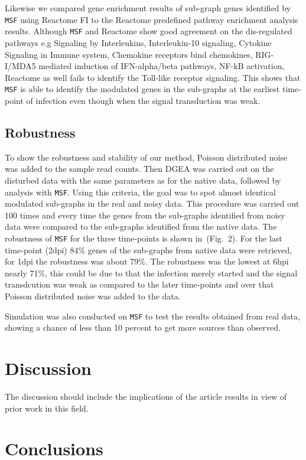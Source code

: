 \documentclass[twocolumn]{article}
\begin{document}
Likewise we compared gene enrichment results of sub-graph genes identified by \texttt{MSF} using Reactome FI to the Reactome predefined pathway enrichment analysis results. Although \texttt{MSF} and Reactome show good agreement on the dis-regulated pathways e.g Signaling by Interleukins, Interleukin-10 signaling, Cytokine Signaling in Immune system, Chemokine receptors bind chemokines, RIG-I/MDA5 mediated induction of IFN-alpha/beta pathways, NF-kB activation, Reactome as well fails to identify the Toll-like receptor signaling. This shows that \texttt{MSF} is able to identify the modulated genes in the sub-graphs at the earliest time-point of infection even though when the signal transduction was weak.

\subsection*{Robustness}

To show the robustness and stability of our method, Poisson
distributed noise was added to the sample read counts. 
Then DGEA was carried out on the disturbed data with the
same parameters as for the native data, followed by analysis with
\texttt{MSF}. Using this criteria, the goal was to spot almost
identical modulated sub-graphs in the real and noisy data. This procedure was carried out 100 times and every time the genes from the sub-graphs identified from noisy data were compared to the sub-graphs identified from the native data. The robustness of \texttt{MSF} for the three time-points is shown in~(Fig.~2). For the last time-point (2dpi) 84\% genes of the sub-graphs from native data were retrieved, for 1dpi the robustness was about 79\%. The robustness was the lowest at 6hpi nearly 71\%, this could be due to that the infection merely started and the signal transdcution was weak as compared to the later time-points and over that Poisson distributed noise was added to the data.


Simulation was also conducted on \texttt{MSF} to test the results
obtained from real data, showing a chance of less than 10 percent to
get more sources than observed.


\section*{Discussion}

The discussion should include the implications of the article results
in view of prior work in this field.

\section*{Conclusions}
\end{document}
